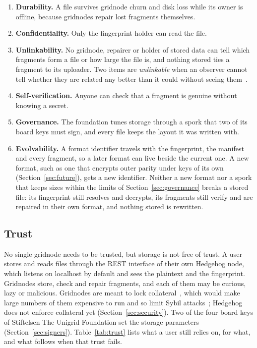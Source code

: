 \documentclass[10pt,a4paper,final]{article}
\begin{document}
\begin{enumerate}
	\item \textbf{Durability.} A file survives gridnode churn and disk loss while its owner is offline, because
	      gridnodes repair lost fragments themselves.
	\item \textbf{Confidentiality.} Only the fingerprint holder can read the file.
	\item \textbf{Unlinkability.} No gridnode, repairer or holder of stored data can tell which fragments form a
	      file or how large the file is, and nothing stored ties a fragment to its uploader. Two items are
	      \emph{unlinkable} when an observer cannot tell whether they are related any better than it could without
	      seeing them~\cite{pfitzmann2010}.
	\item \textbf{Self-verification.} Anyone can check that a fragment is genuine without knowing a secret.
	\item \textbf{Governance.} The foundation tunes storage through a spork that two of its board keys must sign,
	      and every file keeps the layout it was written with.
	\item \textbf{Evolvability.} A format identifier travels with the fingerprint, the manifest and every fragment,
	      so a later format can live beside the current one. A new format, such as one that encrypts outer parity
	      under keys of its own (Section~\ref{sec:future}), gets a new identifier. Neither a new format nor a spork
	      that keeps sizes within the limits of Section~\ref{sec:governance} breaks a stored file: its fingerprint
	      still resolves and decrypts, its fragments still verify and are repaired in their own format, and nothing
	      stored is rewritten.
\end{enumerate}

\subsection{Trust}
\label{sec:trust}

No single gridnode needs to be trusted, but storage is not free of trust. A user stores and reads files through the
REST interface of their own Hedgehog node, which listens on localhost by default and sees the plaintext and the
fingerprint. Gridnodes store, check and repair fragments, and each of them may be curious, lazy or malicious.
Gridnodes are meant to lock collateral~\cite{unigrid-whitepaper}, which would make large numbers of them expensive
to run and so limit Sybil attacks~\cite{douceur2002}; Hedgehog does not enforce collateral yet
(Section~\ref{sec:security}). Two of the four board keys of Stiftelsen The Unigrid Foundation set the storage
parameters (Section~\ref{sec:signers}). Table~\ref{tab:trust} lists what a user still relies on, for what, and what
follows when that trust fails.
\end{document}
